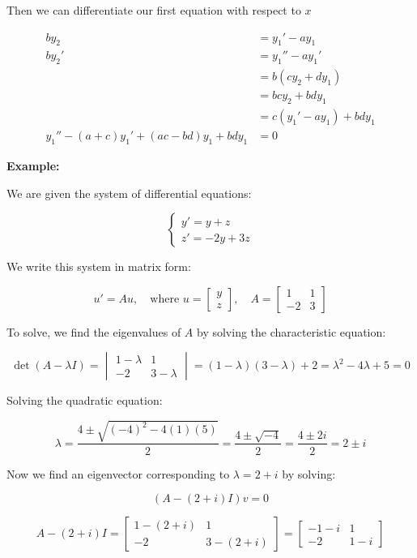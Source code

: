 Then we can differentiate our first equation with respect to \(x\)


\begin{align*}
    by_2 &= y_1' - ay_1\\
    by_2' &= y_1'' - ay_1'\\
    &= b (cy_2 + dy_1)\\
    &= bcy_2 + bdy_1\\
    &= c (y_1' -ay_1 ) + bdy_1\\
    y_1'' - (a + c)y_1' + (ac - bd)y_1 + bdy_1 &= 0
\end{align*}



\textbf{Example:}
\vspace{\baselineskip}

We are given the system of differential equations:

\[
    \begin{cases}
    y' = y + z \\
    z' = -2y + 3z
    \end{cases}
\]

We write this system in matrix form:

\[
    u' = Au, \quad \text{where } u = \begin{bmatrix} y \\ z \end{bmatrix}, \quad A = \begin{bmatrix} 1 & 
        1 \\ -2 & 3 \end{bmatrix}
\]

To solve, we find the eigenvalues of \( A \) by solving the characteristic equation:

\[
    \det(A - \lambda I) = 
    \begin{vmatrix}
    1 - \lambda & 1 \\
    -2 & 3 - \lambda
    \end{vmatrix}
    = (1 - \lambda)(3 - \lambda) + 2 = \lambda^2 - 4\lambda + 5 = 0
\]

Solving the quadratic equation:

\[
    \lambda = \frac{4 \pm \sqrt{(-4)^2 - 4(1)(5)}}{2} = \frac{4 \pm \sqrt{-4}}{2} = \frac{4 \pm 2i}{2} 
    = 2 \pm i
\]

Now we find an eigenvector corresponding to \( \lambda = 2 + i \) by solving:

\[
(A - (2 + i)I)v = 0
\]

\[
    A - (2 + i)I = \begin{bmatrix} 1 - (2 + i) & 1 \\ -2 & 3 - (2 + i) \end{bmatrix}
    = \begin{bmatrix} -1 - i & 1 \\ -2 & 1 - i \end{bmatrix}
\]

